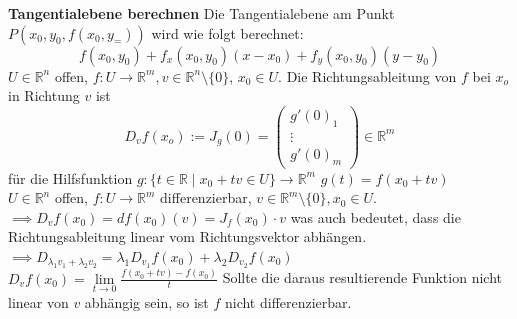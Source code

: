 \textbf{Tangentialebene berechnen}
  Die Tangentialebene am Punkt \(P(x_0, y_0, f(x_0, y_=))\) wird wie folgt berechnet:
  $$f(x_0, y_0) + f_x(x_0, y_0)(x - x_0) + f_y(x_0, y_0)(y - y_0)$$
  \(U\in\mathbb{R}^n\) offen, \(f:U\rightarrow \mathbb{R}^m, v\in\mathbb{R}^n\setminus\{0\}\), \(x_0\in U\). Die Richtungsableitung von \(f\) bei \(x_o\) in Richtung \(v\) ist \[D_v f(x_o) := J_g(0)=\begin{pmatrix}g'(0)_1\\\vdots\\g'(0)_m\end{pmatrix}\in\mathbb R^m\] für die Hilfsfunktion \(g : \{t\in\mathbb R\mid x_0 + tv\in U\}\rightarrow \mathbb R ^m\) \(g(t)=f(x_0+tv)\)\\
  \(U\in\mathbb R^n\) offen, \(f:U\rightarrow\mathbb R^m\) differenzierbar, \(v\in\mathbb R^m\setminus\{0\}, x_0\in U\). \\\(\implies D_vf(x_0)=df(x_0)(v)=J_f(x_0)\cdot v\) was auch bedeutet, dass die Richtungsableitung linear vom Richtungsvektor abhängen.\\
  \(\implies D_{\lambda_1v_1+\lambda_2v_2}=\lambda_1D_{v_1}f(x_0)+\lambda_2D_{v_2}f(x_0)\)\\
  \(D_vf(x_0)=\lim\limits_{t\rightarrow0}\frac{f(x_0+tv)-f(x_0)}{t}\) Sollte die
  daraus resultierende Funktion nicht linear von \(v\) abhängig sein, so ist
  \(f\) nicht differenzierbar.
